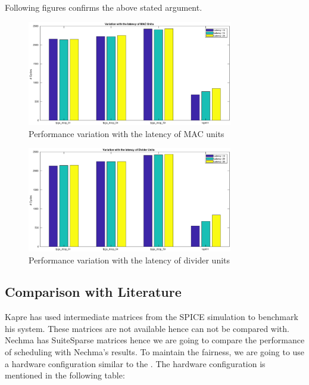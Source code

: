 Following figures confirms the above stated argument.
\begin{figure}[H]
    \centering
    \includegraphics[width = 0.8\textwidth]{./Results/macLatVar.eps}
    \caption{Performance variation with the latency of MAC units}
    \label{fig:res:macLatVar:plot}
\end{figure}

\begin{figure}[H]
    \centering
    \includegraphics[width = 0.8\textwidth]{./Results/divLatVar.eps}
    \caption{Performance variation with the latency of divider units}
    \label{fig:res:divLatVar:plot}
\end{figure}








\subsection{Comparison with Literature}
Kapre \cite{Kapre} has used intermediate matrices from the SPICE simulation to 
benchmark his system. These matrices are not available hence can not be compared with.
Nechma \cite{Nechma} has SuiteSparse matrices hence we are going to compare the performance of 
scheduling with Nechma's results. To maintain the fairness, we are going to use 
a hardware configuration similar to the \cite{Nechma}. The hardware configuration is 
mentioned in the following table:


